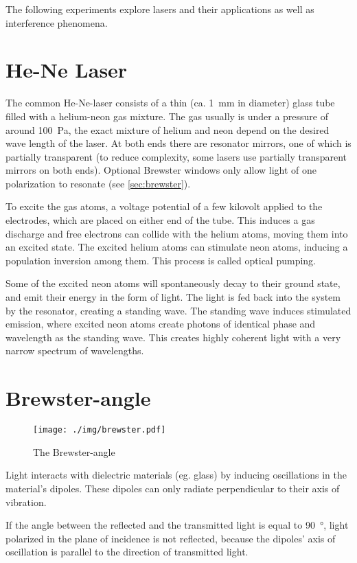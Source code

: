 The following experiments explore lasers and their applications as well as interference phenomena.

\section{He-Ne Laser}
The common He-Ne-laser consists of a thin (ca. \SI{1}{\milli\meter} in diameter) glass tube filled with a helium-neon gas mixture.
The gas usually is under a pressure of around \SI{100}{\pascal}, the exact mixture of helium and neon depend on the desired wave length of the laser.
At both ends there are resonator mirrors, one of which is partially transparent (to reduce complexity, some lasers use partially transparent mirrors on both ends).
Optional Brewster windows only allow light of one polarization to resonate (see \autoref{sec:brewster}).

To excite the gas atoms, a voltage potential of a few kilovolt applied to the electrodes, which are placed on either end of the tube.
This induces a gas discharge and free electrons can collide with the helium atoms, moving them into an excited state.
The excited helium atoms can stimulate neon atoms, inducing a population inversion among them.
This process is called optical pumping.

Some of the excited neon atoms will spontaneously decay to their ground state, and emit their energy in the form of light.
The light is fed back into the system by the resonator, creating a standing wave.
The standing wave induces stimulated emission, where excited neon atoms create photons of identical phase and wavelength as the standing wave.
This creates highly coherent light with a very narrow spectrum of wavelengths.

\section{Brewster-angle}\label{sec:brewster}

\begin{figure}[tb]
	\centering
	\texttt{[image: ./img/brewster.pdf]}
	\caption[Brewster-angle]{The Brewster-angle}
\end{figure}

Light interacts with dielectric materials (eg. glass) by inducing oscillations in the material's dipoles.
These dipoles can only radiate perpendicular to their axis of vibration.

If the angle between the reflected and the transmitted light is equal to \SI{90}{\degree}, light polarized in the plane of incidence is not reflected, because the dipoles' axis of oscillation is parallel to the direction of transmitted light.


